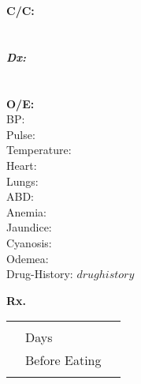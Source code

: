 \documentclass[12pt]{article}
\begin{document}
\begin{paracol}{2}

    \begin{tcolorbox}[blanker, breakable, width=\linewidth]
    {\fontsize{8}{14}\selectfont

    \textbf{\large C/C:}
    \\
    
    \\ \\
    \textbf{\large\em Dx:}
    \\
    
    \\ \\
    \textbf{\large O/E:}
    \\
    BP:  \\
	Pulse: \\
	Temperature: \\
	Heart: \\
	Lungs: \\
	ABD: \\
	Anemia: \\
	Jaundice: \\
	Cyanosis: \\
	Odemea: \\
	Drug-History: $ drug history $\\
    }
    \end{tcolorbox}

    \setlength{\columnseprule}{0.4pt}
    \switchcolumn
    \begin{tcolorbox}[blanker, breakable, width=\linewidth]

    {\bf Rx.}
    \\
        \begin{supertabular}[l]{lll}
        \\
        
            {\bf }  &  &  \\
                 & Days &   \\
                 & Before Eating \\
                    &             &         \\
            
        \end{supertabular}
    \end{tcolorbox}
\end{paracol}
\end{document}
